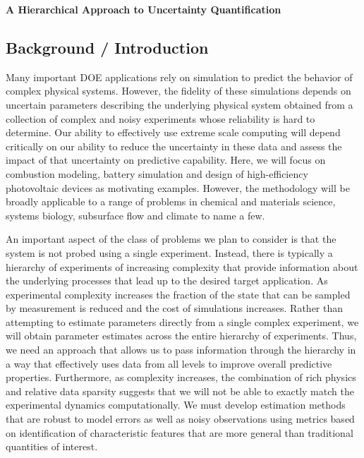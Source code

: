\documentclass[11pt]{article}
\newcommand{\MarginPar}[1]{\marginpar{%
\vskip-\baselineskip %
\raggedright\tiny\sffamily
\hrule\smallskip{\color{red}#1}\par\smallskip\hrule}}
\begin{document}
\begin{center}
{\large{\textbf{A Hierarchical Approach to Uncertainty Quantification}}}
\end{center}

\subsection*{Background / Introduction}

Many important DOE applications rely on simulation to predict the behavior of complex physical systems.
However, the fidelity of these simulations depends on uncertain parameters describing the underlying physical system
obtained from a collection of
complex and noisy experiments whose reliability is hard to determine. 
Our ability to effectively use extreme scale computing will depend critically on our ability to reduce the
uncertainty in these data and assess the impact of that uncertainty on predictive capability.
Here, we will focus on combustion modeling, battery simulation and design of high-efficiency photovoltaic
devices as motivating examples.
\MarginPar{a bit more detail here?}
However, the methodology will be broadly applicable to a
range of problems in chemical and materials science, systems biology, subsurface flow and climate to name a
few.

An important aspect of the class of problems we plan to consider is that 
the system is not probed using a single experiment.  Instead,
there is typically a hierarchy
of experiments of increasing complexity that provide information about the underlying processes
that lead up to the desired target application.
As experimental complexity increases the fraction of the state that can be sampled
by measurement is reduced and the cost of simulations increases.
Rather than attempting to estimate parameters directly from a single complex experiment, we 
will obtain parameter estimates across the entire hierarchy of experiments.
Thus, we need an approach that allows us to pass
information through the hierarchy in a way that effectively uses data from all levels
to improve overall predictive properties.
Furthermore, as complexity increases,
the combination of rich physics and relative data sparsity suggests that we will not be
able to exactly match the experimental dynamics computationally.
We must develop estimation methods that are robust to model errors as well as noisy observations
using metrics based on identification of characteristic features that are more general than
traditional quantities of interest.
\end{document}
